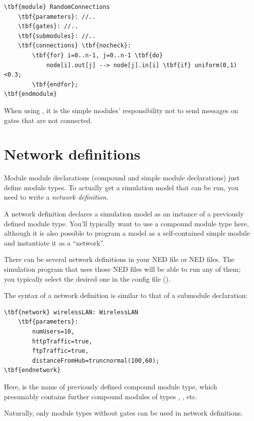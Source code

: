 \begin{Verbatim}[commandchars=\\\{\}]
\tbf{module} RandomConnections
    \tbf{parameters}: //..
    \tbf{gates}: //..
    \tbf{submodules}: //..
    \tbf{connections} \tbf{nocheck}:
        \tbf{for} i=0..n-1, j=0..n-1 \tbf{do}
            node[i].out[j] --> node[j].in[i] \tbf{if} uniform(0,1)<0.3;
        \tbf{endfor};
\tbf{endmodule}
\end{Verbatim}

When using , it is the
simple modules' responsibility not to send messages on gates
that are not connected.


\section{Network definitions}
\label{sec:ch-ned-lang:network}

Module module declarations (compound and simple module declarations)
just define module types. To actually get a simulation model that
can be run, you need to write a \textit{network definition}.

A network definition declares a simulation model as an instance
of a previously defined module type. You'll typically want to use
a compound module type here, although it is also possible to
program a model as a self-contained simple module and instantiate it
as a ``network''.

There can be several network definitions in your NED file or NED files.
The simulation program that uses those NED files will be
able to run any of them; you typically select the desired one
in the config file ().

The syntax of a network definition is similar to that of a submodule
declaration:

\begin{Verbatim}[commandchars=\\\{\}]
\tbf{network} wirelessLAN: WirelessLAN
    \tbf{parameters}:
        numUsers=10,
        httpTraffic=true,
        ftpTraffic=true,
        distanceFromHub=truncnormal(100,60);
\tbf{endnetwork}
\end{Verbatim}

Here,  is the name of previously defined
compound module type, which presumably contains further
compound modules of types , , etc.

Naturally, only module types without gates can
be used in network definitions.

